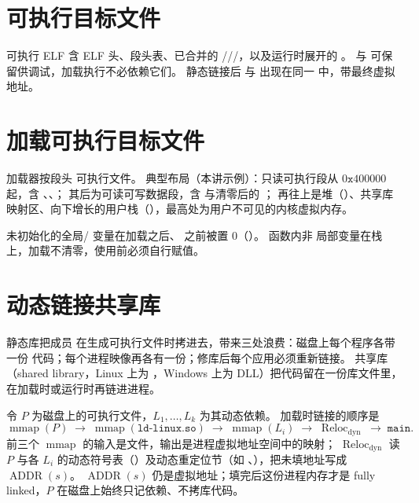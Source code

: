 \section{可执行目标文件}

可执行 ELF 含 ELF 头、段头表、已合并的 ///，以及运行时展开的 。
 与  可保留供调试，加载执行不必依赖它们。
静态链接后  与  出现在同一  中，带最终虚拟地址。

\section{加载可执行目标文件}



加载器按段头  可执行文件。
典型布局（本讲示例）：只读可执行段从 $0\texttt{x}400000$ 起，含 、、；
其后为可读可写数据段，含  与清零后的 ；
再往上是堆（）、共享库映射区、向下增长的用户栈（），最高处为用户不可见的内核虚拟内存。

未初始化的全局/ 变量在加载之后、 之前被置 $0$（）。
函数内非  局部变量在栈上，加载不清零，使用前必须自行赋值。

\section{动态链接共享库}

静态库把成员  在生成可执行文件时拷进去，带来三处浪费：磁盘上每个程序各带一份  代码；每个进程映像再各有一份；修库后每个应用必须重新链接。
共享库（shared library，Linux 上为 ，Windows 上为 DLL）把代码留在一份库文件里，在加载时或运行时再链进进程。


令 $P$ 为磁盘上的可执行文件，$L_1,\ldots,L_k$ 为其动态依赖。
加载时链接的顺序是
\[
\operatorname{mmap}(P)
\;\to\;
\operatorname{mmap}(\texttt{ld-linux.so})
\;\to\;
\operatorname{mmap}(L_i)
\;\to\;
\operatorname{Reloc}_{\mathrm{dyn}}
\;\to\;
\texttt{main}.
\]
前三个 $\operatorname{mmap}$ 的输入是文件，输出是进程虚拟地址空间中的映射；
$\operatorname{Reloc}_{\mathrm{dyn}}$ 读 $P$ 与各 $L_i$ 的动态符号表（）及动态重定位节（如 、），把未填地址写成 $\operatorname{ADDR}(s)$。
$\operatorname{ADDR}(s)$ 仍是虚拟地址；填完后这份进程内存才是 fully linked，$P$ 在磁盘上始终只记依赖、不拷库代码。

